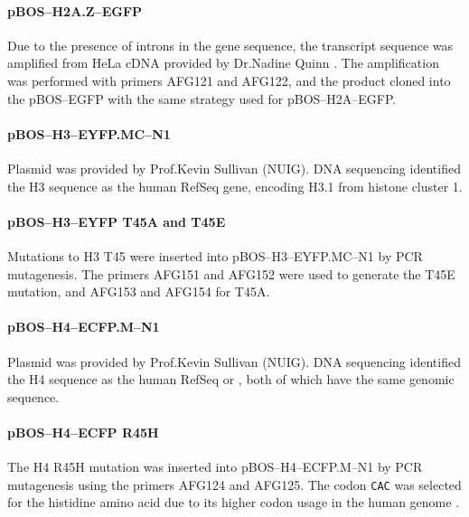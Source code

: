       \paragraph{pBOS--H2A.Z--EGFP}
      Due to the presence of introns in the  gene
      sequence, the transcript sequence was amplified from HeLa cDNA
      provided by Dr.\@ Nadine Quinn \citep{NadineThesis}.  The
      amplification was performed with primers AFG121 and AFG122, and
      the product cloned into the pBOS--EGFP with the same strategy
      used for pBOS--H2A--EGFP.

      \paragraph{pBOS--H3--EYFP.MC--N1}
      Plasmid was provided by Prof.\@ Kevin Sullivan (NUIG).  DNA
      sequencing identified the H3 sequence as the human RefSeq
       gene, encoding H3.1 from histone cluster 1.

      \paragraph{pBOS--H3--EYFP T45A and T45E}
      Mutations to H3 T45 were inserted into pBOS--H3--EYFP.MC--N1 by
      PCR mutagenesis. The primers AFG151 and AFG152 were used
      to generate the
      T45E mutation, and AFG153 and AFG154 for T45A.

      \paragraph{pBOS--H4--ECFP.M--N1}
      Plasmid was provided by Prof.\@ Kevin Sullivan (NUIG).  DNA
      sequencing identified the H4 sequence as the human RefSeq
       or , both of which have the same
      genomic sequence.

      \paragraph{pBOS--H4--ECFP R45H}
      The H4 R45H mutation was inserted into pBOS--H4--ECFP.M--N1 by
      PCR mutagenesis using the primers AFG124 and AFG125. The codon
      \texttt{CAC} was selected for the histidine amino acid due to
      its higher codon usage in the human genome \citep{codon_usage}.

